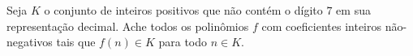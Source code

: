 Seja $K$ o conjunto de inteiros positivos que não contém o dígito $7$ em sua representação decimal. Ache todos os polinômios $f$ com coeficientes inteiros não-negativos tais que $f(n) \in K$ para todo $n\in K$.

